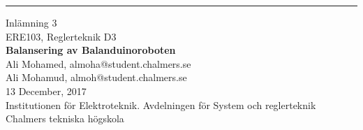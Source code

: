 \newcommand{\no}{3}
\newcommand{\subject}{Balansering av Balanduinoroboten}

\thispagestyle{empty}
\parbox[h!][\textheight][t]{\textwidth}{
\parbox[h!][\textheight][t]{0.19\textwidth}{

\vspace*{0.075\textheight}
\hspace*{0.15\textwidth}
\rule[\textheight]{1.5pt}{0.85\textheight}
}
\parbox[h!][0.85\textheight][t]{0.76\textwidth}{
\vspace{10em}

{\huge Inlämning \no} \\[0.1cm]
{\Large{ERE103, Reglerteknik D3}} \\[0.8cm]
{\Large \bf \subject} \\ [1cm]
{\Large Ali Mohamed, almoha@student.chalmers.se\\[0.3em]
Ali Mohamud, almoh@student.chalmers.se
\\[0.8cm]
13 December, 2017}
 \\[0.39\textheight]
Institutionen för Elektroteknik. Avdelningen för System och reglerteknik\\
Chalmers tekniska högskola
}}
\restoregeometry